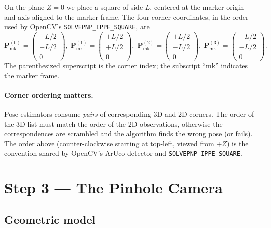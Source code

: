 \documentclass[11pt]{article}
\newcommand{\Pmark}{\mathbf{P}_{\text{mk}}}
\begin{document}
On the plane $Z = 0$ we place a square of side $L$, centered at the marker
origin and axis-aligned to the marker frame. The four corner coordinates,
in the order used by OpenCV's \verb|SOLVEPNP_IPPE_SQUARE|, are
\begin{equation}
  \Pmark^{(0)} = \begin{pmatrix} -L/2 \\ +L/2 \\ 0 \end{pmatrix}, \;
  \Pmark^{(1)} = \begin{pmatrix} +L/2 \\ +L/2 \\ 0 \end{pmatrix}, \;
  \Pmark^{(2)} = \begin{pmatrix} +L/2 \\ -L/2 \\ 0 \end{pmatrix}, \;
  \Pmark^{(3)} = \begin{pmatrix} -L/2 \\ -L/2 \\ 0 \end{pmatrix}.
\end{equation}
The parenthesized superscript is the corner index; the subscript ``mk''
indicates the marker frame.

\paragraph{Corner ordering matters.}
Pose estimators consume \emph{pairs} of corresponding 3D and 2D corners.
The order of the 3D list must match the order of the 2D observations,
otherwise the correspondences are scrambled and the algorithm finds the
wrong pose (or fails). The order above (counter-clockwise starting at
top-left, viewed from $+Z$) is the convention shared by OpenCV's ArUco
detector and \verb|SOLVEPNP_IPPE_SQUARE|.

\section{Step 3 --- The Pinhole Camera}

\subsection{Geometric model}
\end{document}
